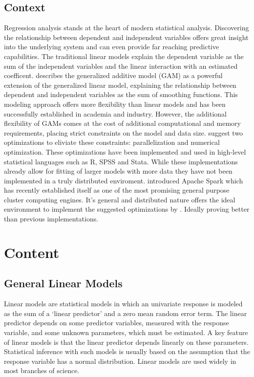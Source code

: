 \documentclass{article}
\begin{document}
    \subsection{Context}
    Regression analysis stands at the heart of modern statistical analysis. Discovering the relationship between dependent and independent variables offers great insight into the underlying system and can even provide far reaching predictive capabilities. The traditional linear models explain the dependent variable as the sum of the independent variables and the linear interaction with an estimated coefficent.\cite{gamBook} describes the generalized additive model (GAM) as a powerful extension of the generalized linear model, explaining the relationship between dependent and independent variables as the sum of smoothing functions. This modeling approach offers more flexibility than linear models and has been successfully established in academia and industry. However, the additional flexibility of GAMs comes at the cost of additional computational and memory requirements, placing strict constraints on the model and data size.\cite{bigdataGAM} suggest two optimizations to eliviate these constraints: parallelization and numerical optimization.
    These optimizations have been implemented and used in high-level statistical languages such as R, SPSS and Stata. While these implementations already allow for fitting of larger models with more data they have not been implemented in a truly distributed enviroment.\cite{spark} introduced Apache Spark which has recently established itself as one of the most promising general purpose cluster computing engines. It's general and distributed nature offers the ideal environment to implement the suggested optimizations by \cite{bigdataGAM}. Ideally proving better than previous implementations.


    \section{Content}
    \subsection{General Linear Models}
    Linear models are statistical models in which an univariate response is modeled as the sum of a ‘linear predictor’ and a zero mean random error term. The linear predictor depends on some predictor variables, measured with the response variable, and some unknown parameters, which must be estimated. A key feature of linear models is that the linear predictor depends linearly on these parameters. Statistical inference with such models is usually based on the assumption that the response variable has a normal distribution. Linear models are used widely in most branches of science.\
\end{document}
